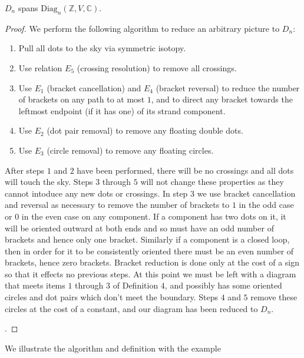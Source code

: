 \documentclass[11pt]{article} %
\begin{document}
\begin{prop}
$D_n$ spans $\text{Diag}_n({\mathbb{Z},V,\mathbb{C}})$.
\end{prop}
\begin{proof}
We perform the following algorithm to reduce an arbitrary picture to $D_n$:
\begin{enumerate}
\item Pull all dots to the sky via symmetric isotopy.
\item Use relation $E_5$ (crossing resolution) to remove all crossings.
\item Use $E_1$ (bracket cancellation) and $E_4$ (bracket reversal) to reduce the number of brackets on any path to at most $1$, and to direct any bracket towards the leftmost endpoint (if it has one) of its strand component.
\item Use $E_2$ (dot pair removal) to remove any floating double dots. 
\item Use $E_3$ (circle removal) to remove any floating circles.
\end{enumerate}
After steps $1$ and $2$ have been performed, there will be no crossings and all dots will touch the sky. Steps $3$ through $5$ will not change these properties as they cannot intoduce any new dots or crossings. In step 3 we use bracket cancellation and reversal as necessary to remove the number of brackets to $1$ in the odd case or $0$ in the even case on any component. If a component has two dots on it, it will be oriented outward at both ends and so must have an odd number of brackets and hence only one bracket. Similarly if a component is a closed loop, then in order for it to be consistently oriented there must be an even number of brackets, hence zero brackets.  Bracket reduction is done only at the cost of a sign so that it effects no previous steps. At this point we must be left with a diagram that meets items $1$ through $3$ of Definition $4$, and possibly has some oriented circles and dot pairs which don't meet the boundary. Steps $4$ and $5$ remove these circles at the cost of a constant, and our diagram has been reduced to $D_n$.

.
\end{proof}

We illustrate the algorithm and definition with the example \hspace{2mm}
\end{document}
